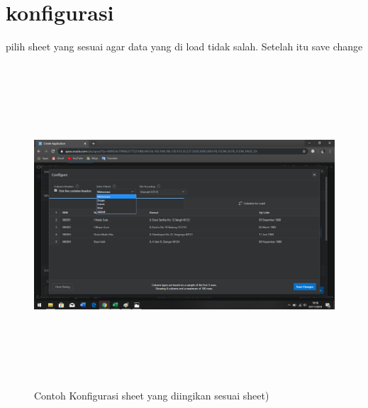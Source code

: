 \documentclass[a4, 13pt]{article}
\begin{document}
      \section{konfigurasi}
      pilih sheet yang sesuai agar data yang di load tidak salah. Setelah itu save change 
    \begin{figure}[!htbp]
        \centering
        \includegraphics[width=16cm, height=12cm]{pictures/C.png}
        \caption{Contoh Konfigurasi sheet yang diingikan sesuai sheet)}
        \label{fig:my_label}
    \end{figure}
    \vspace{2cm}
    
    
\end{document}
